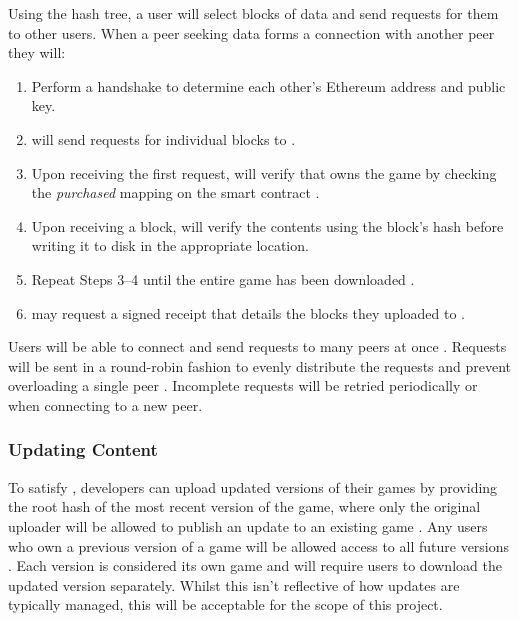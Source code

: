Using the hash tree, a user will select blocks of data and send requests for them to other users. When a peer seeking data \downloader forms a connection with another peer \seeder they will:

\begin{enumerate}
  \item Perform a handshake to determine each other's Ethereum address and public key.
  \item \downloader will send requests for individual blocks to \seeder {}.
  \item Upon receiving the first request, \seeder will verify that \downloader owns the game by checking the \textit{purchased} mapping on the smart contract  .
  \item Upon receiving a block, \downloader will verify the contents using the block's hash  before writing it to disk in the appropriate location.
  \item Repeat Steps 3--4 until the entire game has been downloaded .
  \item \seeder may request a signed receipt that details the blocks they uploaded  to \downloader.
\end{enumerate}

\newparagraph
Users will be able to connect and send requests to many peers at once . Requests will be sent in a round-robin fashion to evenly distribute the requests and prevent overloading a single peer . Incomplete requests will be retried periodically or when connecting to a new peer.

\subsubsection*{Updating Content}\label{subsubsec:updating}

To satisfy , developers can upload updated versions of their games by providing the root hash of the most recent version of the game, where only the original uploader will be allowed to publish an update to an existing game . Any users who own a previous version of a game will be allowed access to all future versions .
\x
Each version is considered its own game and will require users to download the updated version separately. Whilst this isn't reflective of how updates are typically managed, this will be acceptable for the scope of this project.

